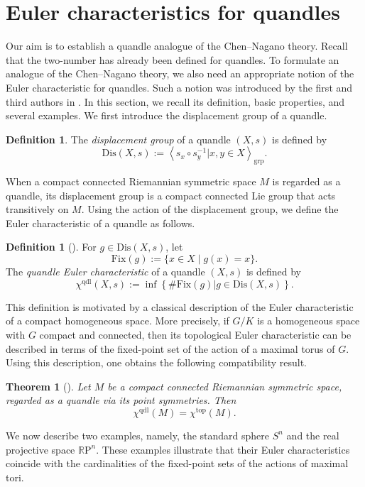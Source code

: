 \documentclass[12pt]{amsart}
\newtheorem{Thm}[Prop]{Theorem}
\theoremstyle{definition}
\newtheorem{Def}[Prop]{Definition}
\newcommand{\R}{{\mathbb R}}
\newcommand{\RP}{\R \mathrm{P}}
\newcommand{\Fix}{\mathrm{Fix}}
\newcommand{\Dis}{\mathrm{Dis}}
\begin{document}

\section{Euler characteristics for quandles} 

Our aim is to establish a quandle analogue of the Chen--Nagano theory.
Recall that the two-number has already been defined for quandles.
To formulate an analogue of the Chen--Nagano theory,
we also need an appropriate notion of the Euler characteristic for quandles.
Such a notion was introduced by the first and third authors in \cite{KT}.
In this section,
we recall its definition, basic properties, and several examples.
We first introduce the displacement group of a quandle.

\begin{Def}
The \textit{displacement group} of a quandle $(X,s)$ is defined by
\[
\Dis(X,s)
:=
\left\langle
s_x\circ s_y^{-1}
\mathrel{\Big|}
x,y\in X
\right\rangle_{\mathrm{grp}}.
\]
\end{Def}

When a compact connected Riemannian symmetric space $M$ is regarded as a quandle,
its displacement group is a compact connected Lie group
that acts transitively on $M$.
Using the action of the displacement group,
we define the Euler characteristic of a quandle as follows.

\begin{Def}[\cite{KT}]
For $g\in\Dis(X,s)$, let
\[
\Fix(g)
:=
\{x\in X\mid g(x)=x\}.
\]
The \textit{quandle Euler characteristic} of a quandle $(X,s)$ is defined by
\[
\chi^{\mathrm{qdl}}(X,s)
:=
\inf
\left\{
\#\Fix(g)
\mathrel{\Big|}
g\in\Dis(X,s)
\right\}.
\]
\end{Def}

This definition is motivated by a classical description of the Euler characteristic of a compact homogeneous space. 
More precisely,
if $G/K$ is a homogeneous space with $G$ compact and connected,
then its topological Euler characteristic can be described
in terms of the fixed-point set of the action of a maximal torus of $G$.
Using this description,
one obtains the following compatibility result.

\begin{Thm}[\cite{KT}]
Let $M$ be a compact connected Riemannian symmetric space,
regarded as a quandle via its point symmetries.
Then
\[
\chi^{\mathrm{qdl}}(M)
=
\chi^{\mathrm{top}}(M).
\]
\end{Thm}

We now describe two examples,
namely, the standard sphere $S^n$ and the real projective space $\RP^n$.
These examples illustrate that their Euler characteristics
coincide with the cardinalities of the fixed-point sets
of the actions of maximal tori.
\end{document}
